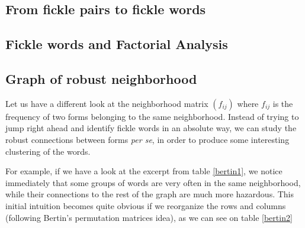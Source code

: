\documentclass[runningheads,a4paper]{llncs}
\begin{document}
\subsection{From fickle pairs to fickle words}

\subsection{Fickle words and Factorial Analysis}

\subsection{Graph of robust neighborhood}

Let us have a different look at the neighborhood matrix $(f_{ij})$ where $f_{ij}$ is the frequency of two forms belonging to the same neighborhood. Instead of trying to jump right ahead and identify fickle words in an absolute way, we can study the robust connections between forms \textit{per se}, in order to produce some interesting clustering of the words.

For example, if we have a look at the excerpt from table \ref{bertin1}, we notice immediately that some groups of words are very often in the same neighborhood, while their connections to the rest of the graph are much more hazardous. This initial intuition becomes quite obvious if we reorganize the rows and columns (following Bertin's permutation matrices idea), as we can see on table \ref{bertin2}
\end{document}
